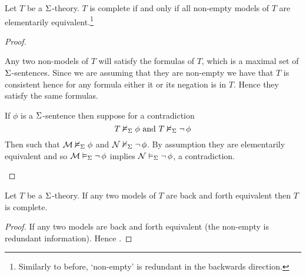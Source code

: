 \begin{lem}
    Let $T$ be a $\Sigma$-theory.
    $T$ is complete if and only if all non-empty models of 
    $T$ are elementarily equivalent.\footnote{Similarly to before, 
        `non-empty' is redundant in the backwards direction.}
\end{lem}
\begin{proof}
    \begin{forward}
        Any two non-models of $T$ will satisfy the formulas of $T$, 
        which is a maximal set of $\Sigma$-sentences.
        Since we are assuming that they are non-empty we have that 
        $T$ is consistent
        hence for any formula either it or its negation is in $T$.
        Hence they satisfy the same formulas.    
    \end{forward}
    
    \begin{backward}
        If $\phi$ is a $\Sigma$-sentence then suppose for a contradiction 
        \[T \nvDash_{\Sigma} \phi \text{ and } T \nvDash_{\Sigma} \neg\, \phi\]
        Then  
        such that $\mathcal{M} \nvDash_{\Sigma} \phi$ and $\mathcal{N} \nvDash_{\Sigma} \neg\, \phi$.
        By assumption they are elementarily equivalent and so 
        $\mathcal{M} \vDash_{\Sigma} \neg\, \phi$ implies $\mathcal{N} \vDash_{\Sigma} \neg\, \phi$,
        a contradiction.
    \end{backward}
\end{proof}

\begin{cor}
    Let $T$ be a $\Sigma$-theory.
    If any two models of $T$ are back and forth equivalent then 
    $T$ is complete.
\end{cor}
\begin{proof}
    If any two models are back and forth equivalent 
     (the non-empty is redundant information).
    Hence .
\end{proof}

